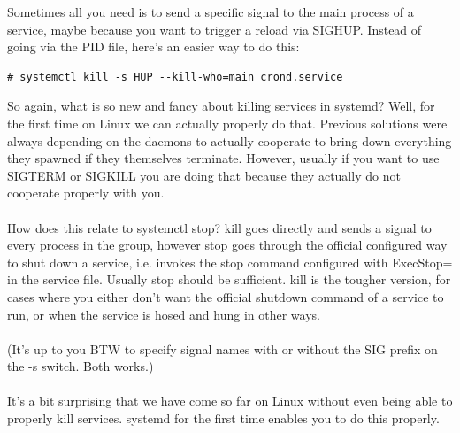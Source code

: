 \documentclass[titlepage]{article}
\begin{document}
Sometimes all you need is to send a specific signal to the main process of a service, maybe because you want to trigger a reload via SIGHUP. Instead of going via the PID file, here's an easier way to do this:
\begin{lstlisting}
# systemctl kill -s HUP --kill-who=main crond.service
\end{lstlisting}
So again, what is so new and fancy about killing services in systemd? Well, for the first time on Linux we can actually properly do that. Previous solutions were always depending on the daemons to actually cooperate to bring down everything they spawned if they themselves terminate. However, usually if you want to use SIGTERM or SIGKILL you are doing that because they actually do not cooperate properly with you.
\\
\\
How does this relate to systemctl stop? kill goes directly and sends a signal to every process in the group, however stop goes through the official configured way to shut down a service, i.e. invokes the stop command configured with ExecStop= in the service file. Usually stop should be sufficient. kill is the tougher version, for cases where you either don't want the official shutdown command of a service to run, or when the service is hosed and hung in other ways.
\\
\\
(It's up to you BTW to specify signal names with or without the SIG prefix on the -s switch. Both works.)
\\
\\
It's a bit surprising that we have come so far on Linux without even being able to properly kill services. systemd for the first time enables you to do this properly.
\end{document}
